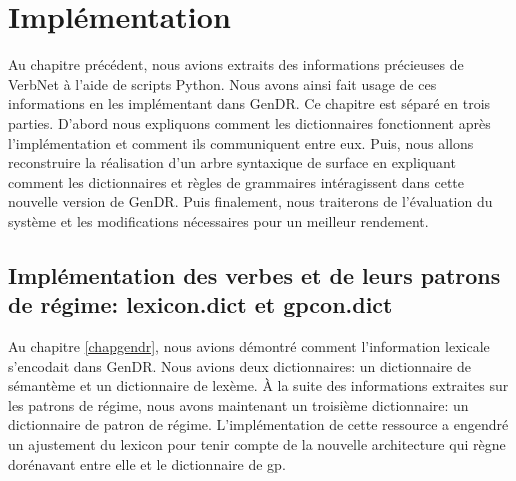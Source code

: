 
\chapter{Implémentation}\label{ch:implementation}

Au chapitre précédent, nous avions extraits des informations précieuses de VerbNet à l'aide de scripts Python. Nous avons ainsi fait usage de ces informations en les implémentant dans GenDR. Ce chapitre est séparé en trois parties. D'abord nous expliquons comment les dictionnaires fonctionnent après l'implémentation et comment ils communiquent entre eux. Puis, nous allons reconstruire la réalisation d'un arbre syntaxique de surface en expliquant comment les dictionnaires et règles de grammaires intéragissent dans cette nouvelle version de GenDR. Puis finalement, nous traiterons de l'évaluation du système et les modifications nécessaires pour un meilleur rendement.

\section{Implémentation des verbes et de leurs patrons de régime: lexicon.dict et gpcon.dict}

Au chapitre \ref{chapgendr}, nous avions démontré comment l'information lexicale s'encodait dans GenDR. Nous avions deux dictionnaires: un dictionnaire de sémantème et un dictionnaire de lexème. À la suite des informations extraites sur les patrons de régime, nous avons maintenant un troisième dictionnaire: un dictionnaire de patron de régime. L'implémentation de cette ressource a engendré un ajustement du lexicon pour tenir compte de la nouvelle architecture qui règne dorénavant entre elle et le dictionnaire de gp.


